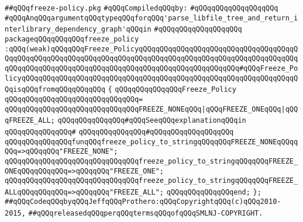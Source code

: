 \label{src/app/makelib/parse/freeze-policy.pkg}
\verb|##qQQqfreeze-policy.pkg|\newline
\newline
\verb|#qQQqCompiledqQQqby:|\newline
\verb|#qQQqqQQqqQQqqQQqqQQq|\newline
\newline
\verb|#qQQqAnqQQqargumentqQQqtypeqQQqforqQQq'parse_libfile_tree_and_return_interlibrary_dependency_graph'qQQqin|\newline
\verb|#qQQqqQQqqQQqqQQqqQQq|\newline
\newline
\verb|packageqQQqqQQqqQQqfreeze_policy|\newline
\verb|:qQQq(weak)qQQqqQQqFreeze_PolicyqQQqqQQqqQQqqQQqqQQqqQQqqQQqqQQqqQQqqQQqqQQqqQQqqQQqqQQqqQQqqQQqqQQqqQQqqQQqqQQqqQQqqQQqqQQqqQQqqQQqqQQqqQQqqQQqqQQqqQQqqQQqqQQqqQQqqQQqqQQqqQQqqQQqqQQqqQQqqQQqqQQq#qQQqFreeze_PolicyqQQqqQQqqQQqqQQqqQQqqQQqqQQqqQQqqQQqqQQqqQQqqQQqqQQqqQQqqQQqqQQqqQQqisqQQqfromqQQqqQQqqQQq|\newline
\verb|{|\newline
\verb|qQQqqQQqqQQqqQQqFreeze_Policy|\newline
\verb|qQQqqQQqqQQqqQQqqQQqqQQqqQQqqQQq=|\newline
\verb|qQQqqQQqqQQqqQQqqQQqqQQqqQQqqQQqFREEZE_NONEqQQq|\verb#|qQQqFREEZE_ONEqQQq|qQQqFREEZE_ALL;#\newline
\newline
\newline
\verb|qQQqqQQqqQQqqQQq#qQQqSeeqQQqexplanationqQQqin|\newline
\verb|qQQqqQQqqQQqqQQq#|\newline
\verb|qQQqqQQqqQQqqQQq#qQQqqQQqqQQqqQQqqQQq|\newline
\newline
\newline
\verb|qQQqqQQqqQQqqQQqfunqQQqfreeze_policy_to_stringqQQqqQQqFREEZE_NONEqQQqqQQq=>qQQqqQQq"FREEZE_NONE";|\newline
\verb|qQQqqQQqqQQqqQQqqQQqqQQqqQQqqQQqfreeze_policy_to_stringqQQqqQQqFREEZE_ONEqQQqqQQqqQQq=>qQQqqQQq"FREEZE_ONE";|\newline
\verb|qQQqqQQqqQQqqQQqqQQqqQQqqQQqqQQqfreeze_policy_to_stringqQQqqQQqFREEZE_ALLqQQqqQQqqQQq=>qQQqqQQq"FREEZE_ALL";|\newline
\verb|qQQqqQQqqQQqqQQqend;|\newline
\verb|};|\newline
\newline
\newline
\newline
\verb|##qQQqCodeqQQqbyqQQqJeffqQQqProthero:qQQqCopyrightqQQq(c)qQQq2010-2015,|\newline
\verb|##qQQqreleasedqQQqperqQQqtermsqQQqofqQQqSMLNJ-COPYRIGHT.|\newline

